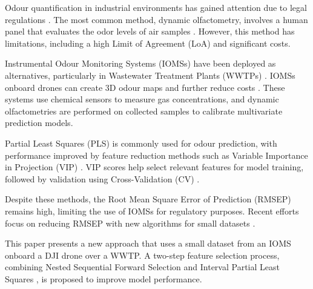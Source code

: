 \documentclass[final,3p,times,twocolumn]{elsarticle}
\begin{document}
Odour quantification in industrial environments has gained attention due to legal regulations \cite{Brinkmann2018,TotalG,Zhou2019}. The most common method, dynamic olfactometry, involves a human panel that evaluates the odor levels of air samples \cite{Sironi2010}. However, this method has limitations, including a high Limit of Agreement (LoA) and significant costs.

Instrumental Odour Monitoring Systems (IOMSs) have been deployed as alternatives, particularly in Wastewater Treatment Plants (WWTPs) \cite{cangialosi2018,Capelli2008}. IOMSs onboard drones can create 3D odour maps and further reduce costs \cite{Burgues2020,Burgues2021_Ar}. These systems use chemical sensors to measure gas concentrations, and dynamic olfactometries are performed on collected samples to calibrate multivariate prediction models.

Partial Least Squares (PLS) \cite{Wold1984} is commonly used for odour prediction, with performance improved by feature reduction methods such as Variable Importance in Projection (VIP) \cite{Chong2005}. VIP scores help select relevant features for model training, followed by validation using Cross-Validation (CV) \cite{Filzmoser2009}.

Despite these methods, the Root Mean Square Error of Prediction (RMSEP) remains high, limiting the use of IOMSs for regulatory purposes. Recent efforts focus on reducing RMSEP with new algorithms for small datasets \cite{Hastie2009,Wold2001,Martens1989,Arlot2010}.

This paper presents a new approach that uses a small dataset from an IOMS onboard a DJI drone over a WWTP. A two-step feature selection process, combining Nested Sequential Forward Selection \cite{Jain1997,Saeys2007} and Interval Partial Least Squares \cite{Norgaard2000}, is proposed to improve model performance.
\end{document}
